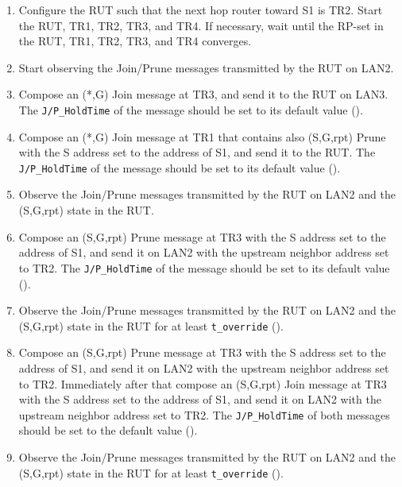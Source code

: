 \documentclass[11pt]{report}
\begin{document}
\begin{enumerate}

  \item Configure the RUT such that the next hop router toward S1 is
  TR2. Start the RUT, TR1, TR2, TR3, and TR4. If necessary, wait until the
  RP-set in the RUT, TR1, TR2, TR3, and TR4 converges.

  \item Start observing the Join/Prune messages transmitted by the RUT on
  LAN2.

  \item Compose an (*,G) Join message at TR3, and send it to the RUT on LAN3.
  The \verb=J/P_HoldTime= of the message should be set to its default
  value ({\PimsmJPHoldTime}).

  \item Compose an (*,G) Join message at TR1 that contains also (S,G,rpt)
  Prune with the S address set to the address of S1, and send it to the RUT.
  The \verb=J/P_HoldTime= of the message should be set to its default
  value ({\PimsmJPHoldTime}).

  \item Observe the Join/Prune messages transmitted by the RUT on LAN2 and the
  (S,G,rpt) state in the RUT.

  \item Compose an (S,G,rpt) Prune message at TR3 with the S address set to
  the address of S1, and send it on LAN2 with the upstream neighbor address
  set to TR2.
  The \verb=J/P_HoldTime= of the message should be set to its default
  value ({\PimsmJPHoldTime}).

  \item Observe the Join/Prune messages transmitted by the RUT on LAN2 and the
  (S,G,rpt) state in the RUT for at least \verb=t_override=
  ({\PimsmTOverride}).

  \item Compose an (S,G,rpt) Prune message at TR3 with the S address set to
  the address of S1, and send it on LAN2 with the upstream neighbor address
  set to TR2. Immediately after that compose an (S,G,rpt) Join message at TR3
  with the S address set to the address of S1, and send it on LAN2 with the
  upstream neighbor address set to TR2.
  The \verb=J/P_HoldTime= of both messages should be set to the default
  value ({\PimsmJPHoldTime}).

  \item Observe the Join/Prune messages transmitted by the RUT on LAN2 and the
  (S,G,rpt) state in the RUT for at least \verb=t_override=
  ({\PimsmTOverride}).


\end{enumerate}
\end{document}
